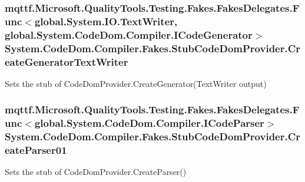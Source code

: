 \hypertarget{class_system_1_1_code_dom_1_1_compiler_1_1_fakes_1_1_stub_code_dom_provider_a44b74d7ea38beedc2a9b029c314611f5}{
\subsubsection[{Create\-Generator\-Text\-Writer}]{\setlength{\rightskip}{0pt plus 5cm}mqttf.\-Microsoft.\-Quality\-Tools.\-Testing.\-Fakes.\-Fakes\-Delegates.\-Func$<$global.\-System.\-I\-O.\-Text\-Writer, global.\-System.\-Code\-Dom.\-Compiler.\-I\-Code\-Generator$>$ System.\-Code\-Dom.\-Compiler.\-Fakes.\-Stub\-Code\-Dom\-Provider.\-Create\-Generator\-Text\-Writer}}\label{class_system_1_1_code_dom_1_1_compiler_1_1_fakes_1_1_stub_code_dom_provider_a44b74d7ea38beedc2a9b029c314611f5}


Sets the stub of Code\-Dom\-Provider.\-Create\-Generator(\-Text\-Writer output)

\hypertarget{class_system_1_1_code_dom_1_1_compiler_1_1_fakes_1_1_stub_code_dom_provider_a94ce804476f9e8828f1ee30984e726d7}{
\subsubsection[{Create\-Parser01}]{\setlength{\rightskip}{0pt plus 5cm}mqttf.\-Microsoft.\-Quality\-Tools.\-Testing.\-Fakes.\-Fakes\-Delegates.\-Func$<$global.\-System.\-Code\-Dom.\-Compiler.\-I\-Code\-Parser$>$ System.\-Code\-Dom.\-Compiler.\-Fakes.\-Stub\-Code\-Dom\-Provider.\-Create\-Parser01}}\label{class_system_1_1_code_dom_1_1_compiler_1_1_fakes_1_1_stub_code_dom_provider_a94ce804476f9e8828f1ee30984e726d7}


Sets the stub of Code\-Dom\-Provider.\-Create\-Parser()

